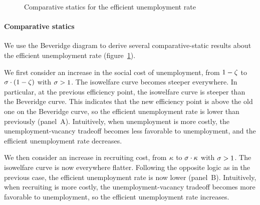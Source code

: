 \documentclass[letterpaper,12pt,leqno]{article}
\def\pdf{../../figures/xhosios_202103.pdf}
\begin{document}
\begin{figure}[t!]
\hfill
{}\vfig
{}
\caption{Comparative statics for the efficient unemployment rate}
\label{f:comparativestatics}\end{figure}

\paragraph{Comparative statics} We use the Beveridge diagram to derive several comparative-static results about the efficient unemployment rate (figure~\ref{f:comparativestatics}). 

We first consider an increase in the social cost of unemployment, from $1-\zeta$ to $\sigma \cdot(1-\zeta)$ with $\sigma>1$. The isowelfare curve becomes steeper everywhere. In particular, at the previous efficiency point, the isowelfare curve is steeper than the Beveridge curve. This indicates that the new efficiency point is above the old one on the Beveridge curve, so the efficient unemployment rate is lower than previously (panel~A). Intuitively, when unemployment is more costly, the unemployment-vacancy tradeoff becomes less favorable to unemployment, and the efficient unemployment rate decreases.

We then consider an increase in recruiting cost, from $\kappa$ to $\sigma\cdot \kappa$ with $\sigma>1$. The isowelfare curve is now everywhere flatter. Following the opposite logic as in the previous case, the efficient unemployment rate is now lower (panel~B). Intuitively, when recruiting is more costly, the unemployment-vacancy tradeoff becomes more favorable to unemployment, so the efficient unemployment rate increases. 
\end{document}
